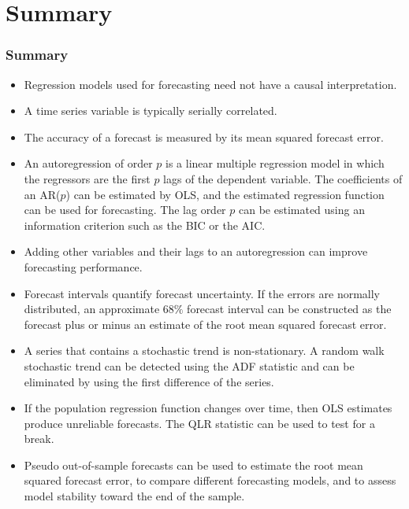 

\section{Summary}


\begin{frame}
\frametitle{Summary}
\begin{itemize}
\item Regression models used for forecasting need not have a causal interpretation.
\item A time series variable is typically serially correlated.
\item The accuracy of a forecast is measured by its mean squared forecast error.
\item An autoregression of order $p$ is a linear multiple regression model in which the regressors are the first $p$ lags of the dependent variable. The coefficients of an AR($p$) can be estimated by OLS, and the estimated regression function can be used for forecasting. The lag order $p$ can be estimated using an information criterion such as the BIC or the AIC.
\item Adding other variables and their lags to an autoregression can improve forecasting performance.
\item Forecast intervals quantify forecast uncertainty. If the errors are normally distributed, an approximate $68\%$ forecast interval can be constructed as the forecast plus or minus an estimate of the root mean squared forecast error.
\item A series that contains a stochastic trend is non-stationary. A random walk stochastic trend can be detected using the ADF statistic and can be eliminated by using the first difference of the series.
\item If the population regression function changes over time, then OLS estimates produce unreliable forecasts. The QLR statistic can be used to test for a break.
\item Pseudo out-of-sample forecasts can be used to estimate the root mean squared forecast error, to compare different forecasting models, and to assess model stability toward the end of the sample.
\end{itemize}
\end{frame}


